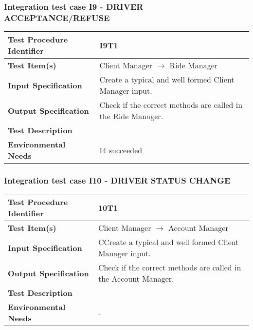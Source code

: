 \subsubsection{Integration test case I9 - DRIVER ACCEPTANCE/REFUSE }
 \begin{tabular}{l p{}}
    \hline
    \textbf{Test Procedure Identifier} & I9T1  \\
    \hline
    \textbf{Test Item(s)} & Client Manager  $\rightarrow$ Ride Manager \\
    \hline
    \textbf{Input Specification} &  Create a typical and well formed Client Manager input.   \\
    \hline
    \textbf{Output Specification} & Check if the correct methods are called in the Ride Manager. \\
    \hline
    \textbf{Test Description} & \\
    \hline
    \textbf{Environmental Needs} & I4 succeeded \\
    \hline
\end{tabular}

\hfill \newline \newline  
\subsubsection{Integration test case I10 - DRIVER STATUS CHANGE } 
\begin{tabular}{l p{}}
    \hline
    \textbf{Test Procedure Identifier} & 10T1 \\
    \hline
    \textbf{Test Item(s)} & Client Manager  $\rightarrow$ Account Manager \\
    \hline
    \textbf{Input Specification} &  CCreate a typical and well formed Client Manager input. \\
    \hline
    \textbf{Output Specification} &  Check if the correct methods are called in the Account Manager.\\
    \hline
    \textbf{Test Description} & \\
    \hline
    \textbf{Environmental Needs} & - \\
    \hline
\end{tabular}